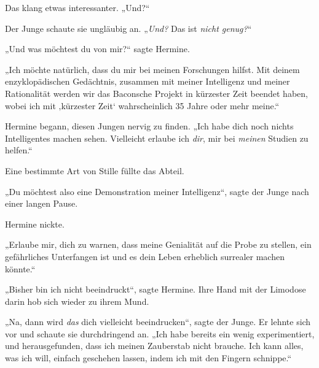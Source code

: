 Das klang etwas interessanter. „Und?“

Der Junge schaute sie ungläubig an. „\emph{Und?} Das ist \emph{nicht genug?}“

„Und was möchtest du von mir?“ sagte Hermine.

„Ich möchte natürlich, dass du mir bei meinen Forschungen hilfst. Mit deinem enzyklopädischen Gedächtnis, zusammen mit meiner Intelligenz und meiner Rationalität werden wir das Baconsche Projekt in kürzester Zeit beendet haben, wobei ich mit ‚kürzester Zeit‘ wahrscheinlich 35 Jahre oder mehr meine.“

Hermine begann, diesen Jungen nervig zu finden. „Ich habe dich noch nichts Intelligentes machen sehen. Vielleicht erlaube ich \emph{dir}, mir bei \emph{meinen} Studien zu helfen.“

Eine bestimmte Art von Stille füllte das Abteil.

„Du möchtest also eine Demonstration meiner Intelligenz“, sagte der Junge nach einer langen Pause.

Hermine nickte.

„Erlaube mir, dich zu warnen, dass meine Genialität auf die Probe zu stellen, ein gefährliches Unterfangen ist und es dein Leben erheblich surrealer machen könnte.“

„Bisher bin ich nicht beeindruckt“, sagte Hermine. Ihre Hand mit der Limodose darin hob sich wieder zu ihrem Mund.

„Na, dann wird \emph{das} dich vielleicht beeindrucken“, sagte der Junge. Er lehnte sich vor und schaute sie durchdringend an. „Ich habe bereits ein wenig experimentiert, und herausgefunden, dass ich meinen Zauberstab nicht brauche. Ich kann alles, was ich will, einfach geschehen lassen, indem ich mit den Fingern schnippe.“

